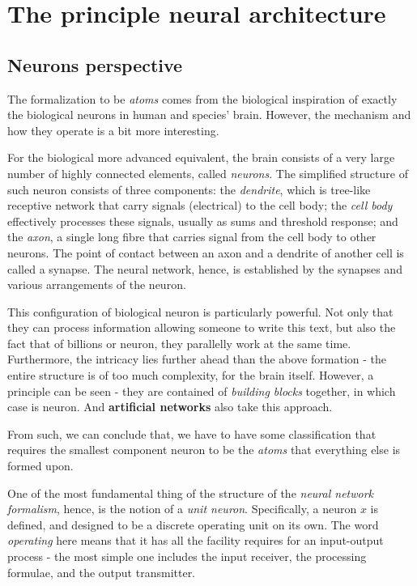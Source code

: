\chapter{The principle neural architecture}

\section{Neurons perspective}

The formalization to be \textit{atoms} comes from the biological inspiration of exactly the biological neurons in human and species' brain. However, the mechanism and how they operate is a bit more interesting. 

For the biological more advanced equivalent, the brain consists of a very large number of highly connected elements, called \textit{neurons}. The simplified structure of such neuron consists of three components: the \textit{dendrite}, which is tree-like receptive network that carry signals (electrical) to the cell body; the \textit{cell body} effectively processes these signals, usually as sums and threshold response; and the \textit{axon}, a single long fibre that carries signal from the cell body to other neurons. The point of contact between an axon and a dendrite of another cell is called a synapse. The neural network, hence, is established by the synapses and various arrangements of the neuron. 

This configuration of biological neuron is particularly powerful. Not only that they can process information allowing someone to write this text, but also the fact that of billions or neuron, they parallelly work at the same time. Furthermore, the intricacy lies further ahead than the above formation - the entire structure is of too much complexity, for the brain itself. However, a principle can be seen - they are contained of \textit{building blocks} together, in which case is neuron. And \textbf{artificial networks} also take this approach. 

\begin{note}
From such, we can conclude that, we have to have some classification that requires the smallest component neuron to be the \textit{atoms} that everything else is formed upon.
\end{note}

One of the most fundamental thing of the structure of the \textit{neural network formalism}, hence, is the notion of a \textit{unit neuron}. Specifically, a neuron $x$ is defined, and designed to be a discrete operating unit on its own. The word \textit{operating} here means that it has all the facility requires for an input-output process - the most simple one includes the input receiver, the processing formulae, and the output transmitter. 

